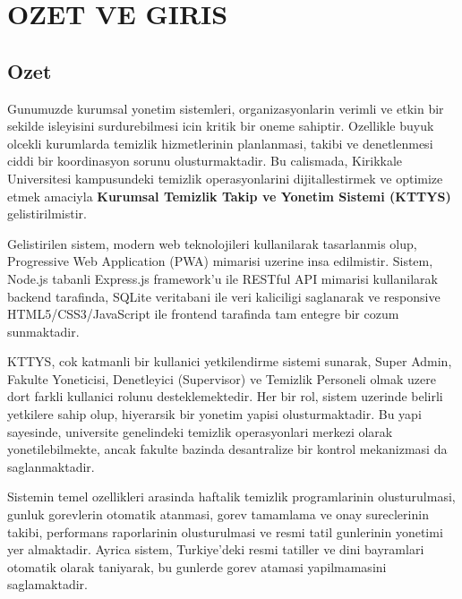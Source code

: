 
\chapter{OZET VE GIRIS}
\label{chap:ozet}

\section{Ozet}
\label{sec:ozet}

Gunumuzde kurumsal yonetim sistemleri, organizasyonlarin verimli ve etkin bir 
sekilde isleyisini surdurebilmesi icin kritik bir oneme sahiptir. Ozellikle 
buyuk olcekli kurumlarda temizlik hizmetlerinin planlanmasi, takibi ve 
denetlenmesi ciddi bir koordinasyon sorunu olusturmaktadir. Bu calismada, 
Kirikkale Universitesi kampusundeki temizlik operasyonlarini dijitallestirmek 
ve optimize etmek amaciyla \textbf{Kurumsal Temizlik Takip ve Yonetim Sistemi 
(KTTYS)} gelistirilmistir.

Gelistirilen sistem, modern web teknolojileri kullanilarak tasarlanmis olup, 
Progressive Web Application (PWA) mimarisi uzerine insa edilmistir. Sistem, 
Node.js tabanli Express.js framework'u ile RESTful API mimarisi kullanilarak 
backend tarafinda, SQLite veritabani ile veri kaliciligi saglanarak ve 
responsive HTML5/CSS3/JavaScript ile frontend tarafinda tam entegre bir 
cozum sunmaktadir.

KTTYS, cok katmanli bir kullanici yetkilendirme sistemi sunarak, Super Admin, 
Fakulte Yoneticisi, Denetleyici (Supervisor) ve Temizlik Personeli olmak uzere 
dort farkli kullanici rolunu desteklemektedir. Her bir rol, sistem uzerinde 
belirli yetkilere sahip olup, hiyerarsik bir yonetim yapisi olusturmaktadir. 
Bu yapi sayesinde, universite genelindeki temizlik operasyonlari merkezi 
olarak yonetilebilmekte, ancak fakulte bazinda desantralize bir kontrol 
mekanizmasi da saglanmaktadir.

Sistemin temel ozellikleri arasinda haftalik temizlik programlarinin 
olusturulmasi, gunluk gorevlerin otomatik atanmasi, gorev tamamlama ve onay 
sureclerinin takibi, performans raporlarinin olusturulmasi ve resmi tatil 
gunlerinin yonetimi yer almaktadir. Ayrica sistem, Turkiye'deki resmi tatiller 
ve dini bayramlari otomatik olarak taniyarak, bu gunlerde gorev atamasi 
yapilmamasini saglamaktadir.

